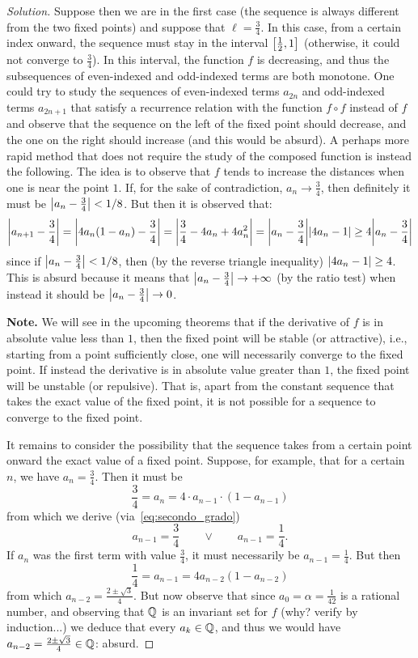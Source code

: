 \begin{proof}[Solution]
  Suppose then we are in the first case (the sequence is always
  different from the two fixed points) and suppose that $\ell = \frac 3 4$. In
  this case, from a certain index onward, the sequence must stay
    in the interval $\left[\frac 1 2,1\right]$ (otherwise, it could not
  converge to
  $\frac 3 4$). In this interval, the function $f$ is decreasing, and thus
  the subsequences of even-indexed and odd-indexed terms are
  both monotone. One could try to study the sequences of
    even-indexed terms $a_{2n}$ and odd-indexed terms $a_{2n+1}$ that satisfy a
  recurrence relation
  with the function $f\circ f$ instead of $f$ and observe that the sequence
    on the left of the fixed point should decrease, and the one on the right
  should increase (and this would be absurd). A perhaps more
    rapid method that does not require the study of the composed function is
  instead the following.
    The idea is to observe that $f$ tends to increase the distances when one is
  near
    the point $1$. If, for the sake of contradiction, $a_n\to \frac 3 4$, then
  definitely
  it must be ${\left|a_n-\frac 3 4\right|}< 1/8$. But then it is observed that:
  \[
    {\left|a_{n+1}-\frac 3 4\right|}
    = {\left|4a_n(1-a_n)-\frac 3 4\right|}
    = {\left|\frac 3 4 - 4a_n + 4a_n^2\right|}
    = {\left|a_n-\frac 3 4\right|}{\left|4a_n -1\right|}
    \ge 4{\left|a_n-\frac 3 4\right|}
  \]
  since if ${\left|a_n-\frac 3 4\right|}<1/8$, then (by the reverse triangle inequality)
    ${\left|4a_n-1\right|}\ge 4$. This is absurd because it means that ${\left|a_n -\frac 3
  4\right|}\to +\infty$
  (by the ratio test) when instead it should be ${\left|a_n-\frac 3 4\right|}\to 0$.

  \textbf{Note.} We will see in the upcoming theorems that
  if the derivative of $f$ is in absolute value less than
  $1$, then the fixed point will be stable (or attractive), i.e., starting
  from a point sufficiently close, one will necessarily converge to
  the fixed point. If instead the derivative is in absolute value greater than
  $1$, the fixed point will be unstable (or repulsive). That is, apart from the
  constant sequence that takes the exact value of the fixed point,
  it is
  not possible for a sequence to converge to the fixed point.

  It remains to consider the possibility that the sequence takes from a
  certain point onward the exact value of a fixed point. Suppose, for
  example, that for a certain $n$, we have $a_n=\frac 3 4$. Then it must be
  \[
  \frac 3 4 = a_n = 4\cdot a_{n-1} \cdot (1-a_{n-1})
  \]
  from which we derive (via~\eqref{eq:secondo_grado})
  \[
  a_{n-1} = \frac 3 4 
  \qquad\lor\qquad
  a_{n-1} = \frac 1 4.
  \]
  If $a_n$ was the first term with value $\frac 3 4$, it must necessarily
  be $a_{n-1} = \frac 1 4$. But then
  \[
  \frac 1 4 = a_{n-1} = 4 a_{n-2}(1-a_{n-2})
  \]
  from which $a_{n-2} = \frac{2\pm\sqrt 3}{4}$. But now observe that since $a_0=
  \alpha = \frac 1 {42}$ is a rational number, and observing that ${\mathbb Q}$ is an
  invariant set for $f$ (why? verify by induction...)
  we deduce that every $a_k \in {\mathbb Q}$, and thus
  we would have $a_{n-2} = \frac{2\pm\sqrt 3}{4} \in {\mathbb Q}$: absurd.


\end{proof}

